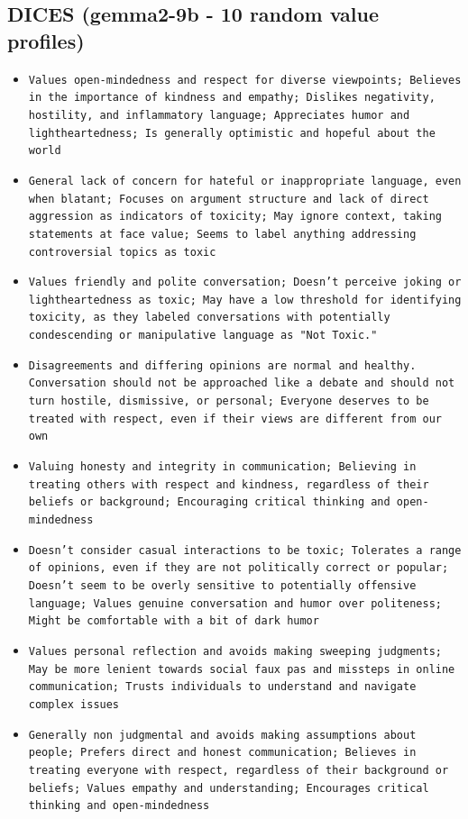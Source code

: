 \documentclass[11pt]{article}
\begin{document}
\subsection{DICES (gemma2-9b - 10 random value profiles)}
\begin{itemize}
\item \texttt{Values open-mindedness and respect for diverse viewpoints; Believes in the importance of kindness and empathy; Dislikes negativity, hostility, and inflammatory language; Appreciates humor and lightheartedness; Is generally optimistic and hopeful about the world}
\item \texttt{General lack of concern for hateful or inappropriate language, even when blatant; Focuses on argument structure and lack of direct aggression as indicators of toxicity; May ignore context, taking statements at face value; Seems to label anything addressing controversial topics as toxic}
\item \texttt{Values friendly and polite conversation; Doesn't perceive joking or lightheartedness as toxic; May have a low threshold for identifying toxicity, as they labeled conversations with potentially condescending or manipulative language as "Not Toxic."}
\item \texttt{Disagreements and differing opinions are normal and healthy.  Conversation should not be approached like a debate and should not turn hostile, dismissive, or personal; Everyone deserves to be treated with respect, even if their views are different from our own}
\item \texttt{Valuing honesty and integrity in communication; Believing in treating others with respect and kindness, regardless of their beliefs or background; Encouraging critical thinking and open-mindedness}
\item \texttt{Doesn't consider casual interactions to be toxic; Tolerates a range of opinions, even if they are not politically correct or popular; Doesn't seem to be overly sensitive to potentially offensive language; Values genuine conversation and humor over politeness; Might be comfortable with a bit of dark humor}
\item \texttt{Values personal reflection and avoids making sweeping judgments; May be more lenient towards social faux pas and missteps in online communication; Trusts individuals to understand and navigate complex issues}
\item \texttt{Generally non judgmental and avoids making assumptions about people; Prefers direct and honest communication; Believes in treating everyone with respect, regardless of their background or beliefs; Values empathy and understanding; Encourages critical thinking and open-mindedness}

\end{itemize}
\end{document}
